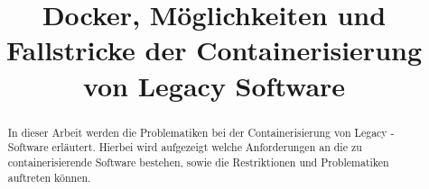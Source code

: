 \documentclass[10pt,conference,a4paper]{IEEEtran}
\begin{document}
\title{Docker, Möglichkeiten und Fallstricke der Containerisierung von Legacy Software}

\author{%
}

\maketitle

\pagestyle{plain}

\maketitle

\begin{abstract}
	In dieser Arbeit werden die Problematiken bei der Containerisierung von Legacy - Software erläutert. Hierbei wird aufgezeigt welche Anforderungen an die zu containerisierende Software bestehen, sowie die Restriktionen und Problematiken auftreten können.
\end{abstract}








\end{document}

